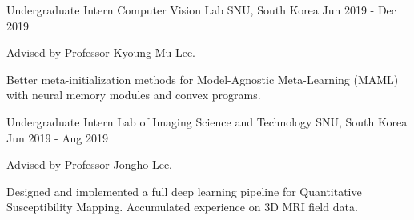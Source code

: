 \begin{cventries}
  \cventry
    {Undergraduate Intern} %
    {Computer Vision Lab} %
    {SNU, South Korea} %
    {Jun 2019 - Dec 2019} %
    {
      \begin{cvitems} %
        \item {Advised by Professor Kyoung Mu Lee.}
        \item {Better meta-initialization methods for Model-Agnostic Meta-Learning (MAML) with neural memory modules and convex programs.}
      \end{cvitems}
    }
    
  \cventry
    {Undergraduate Intern} %
    {Lab of Imaging Science and Technology} %
    {SNU, South Korea} %
    {Jun 2019 - Aug 2019} %
    {
      \begin{cvitems} %
        \item {Advised by Professor Jongho Lee.}
        \item {Designed and implemented a full deep learning pipeline for Quantitative Susceptibility Mapping. Accumulated experience on 3D MRI field data.}
      \end{cvitems}
    }

\end{cventries}
